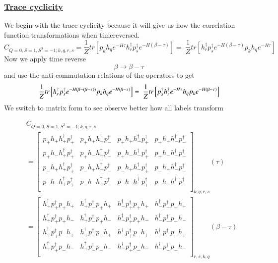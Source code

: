 \subsubsection{\underline{Trace cyclicity}}
We begin with the trace cyclicity because it will give us how the correlation function transformations when timereversed.
\\
\begin{equation*}
  C_{Q=0,S=1,S^3=-1;k,q,r,s} = \frac{1}{Z}tr\left[p_kh_qe^{-H\tau}h^\dagger_rp^\dagger_se^{-H\left(\beta-\tau\right)}\right] =\
  \frac{1}{Z}tr\left[h^\dagger_rp^\dagger_se^{-H\left(\beta-\tau\right)}p_kh_qe^{-H\tau}\right]
\end{equation*}
Now we apply time reverse
$$\beta \rightarrow \beta - \tau$$
and use the anti-commutation relations of the operators to get
\begin{equation}
  \frac{1}{Z}tr\left[h^\dagger_rp^\dagger_se^{-H\left(\beta-\left(\beta-\tau\right)\right)}p_kh_qe^{-H\left(\beta-\tau\right)}\right]=\\\
  \frac{1}{Z}tr\left[p^\dagger_sh^\dagger_re^{-H\tau}h_qp_ke^{-H\left(\beta-\tau\right)}\right]
\end{equation}
We switch to matrix form to see observe better how all labels transform

\renewcommand{\cor}[4]{p_{#1}h_{#2}h^\dagger_{#3}p^\dagger_{#4}}
\newcommand{\dcor}[4]{h_{#3}^\dagger p_{#4}^\dagger p_{#1} h_{#2}}
\begin{equation*}
  \begin{aligned}
    &C_{Q=0,S=1,S^3=-1;k,q,r,s} \\
    &= \left[ 
    {\begin{array}{cccc}
      \cor{+}{+}{+}{+} & \cor{+}{+}{+}{-} & \cor{+}{+}{-}{+} & \cor{+}{+}{-}{-} \\
      \cor{+}{-}{+}{+} & \cor{+}{-}{+}{-} & \cor{+}{-}{-}{+} & \cor{+}{-}{-}{-} \\
      \cor{-}{+}{+}{+} & \cor{-}{+}{+}{-} & \cor{-}{+}{-}{+} & \cor{-}{+}{-}{-} \\
      \cor{-}{-}{+}{+} & \cor{-}{-}{+}{-} & \cor{-}{-}{-}{+} & \cor{-}{-}{-}{-} \\
    \end{array} } \right]_{k,q,r,s} (\tau) \\
    &= \left[ 
    {\begin{array}{cccc}
      \dcor{+}{+}{+}{+} & \dcor{+}{+}{+}{-} & \dcor{+}{+}{-}{+} & \dcor{+}{+}{-}{-} \\
      \dcor{+}{-}{+}{+} & \dcor{+}{-}{+}{-} & \dcor{+}{-}{-}{+} & \dcor{+}{-}{-}{-} \\
      \dcor{-}{+}{+}{+} & \dcor{-}{+}{+}{-} & \dcor{-}{+}{-}{+} & \dcor{-}{+}{-}{-} \\
      \dcor{-}{-}{+}{+} & \dcor{-}{-}{+}{-} & \dcor{-}{-}{-}{+} & \dcor{-}{-}{-}{-} \\
    \end{array} } \right]_{r,s,k,q} (\beta-\tau) \\
  \end{aligned}
\end{equation*}

